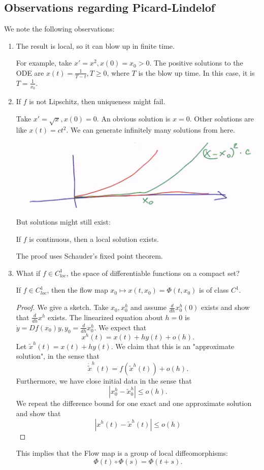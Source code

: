 \documentclass[12pt]{scrartcl}
\begin{document}
\subsection{Observations regarding Picard-Lindelof}
We note the following observations:
\begin{enumerate}
\item The result is local, so it can blow up in finite time.  

For example, take $x' = x^2, x(0) = x_0 > 0$.  The positive solutions to the ODE are $x(t) = \frac{1}{T - t}, T \ge 0$, where $T$ is the blow up time.  In this case, it is $T = \frac{1}{x_0}.$
\item If $f$ is not Lipschitz, then uniqueness might fail.

Take $x' = \sqrt{x}, x(0) = 0$.  An obvious solution is $x = 0$.  Other solutions are like $x(t) = ct^2$.  We can generate infinitely many solutions from here.
\begin{center}
\includegraphics[scale=0.5]{notunique.png}
\end{center}
But solutions might still exist:
\begin{thm}[Peano] If $f$ is continuous, then a local solution exists.
\end{thm}
The proof uses Schauder's fixed point theorem.

\item What if $f \in C_{loc}^1$, the space of differentiable functions on a compact set?
\begin{thm} If $f \in C_{loc}^1$, then the flow map $x_0 \mapsto x(t, x_0) = \Phi(t, x_0)$ is of class $C^1$. 
\end{thm}
\begin{proof}
We give a sketch.  Take $x_0, x_0^h$ and assume $\frac{d}{dh}x_0^h(0)$ exists and show that $\frac{d}{dh}x^h$ exists.  The linearized equation about $h = 0$ is $\dot{y} = Df(x_0)y, y_0 = \frac{d}{dh}x_0^h$.  We expect that $$x^h(t) = x(t) + hy(t) + o(h).$$
Let $\tilde{x}^h(t) = x(t) + hy(t)$.  We claim that this is an "approximate solution", in the sense that $$\dot{\tilde{x}}^h(t) = f(\tilde{x}^h(t)) + o(h).$$
Furthermore, we have close initial data in the sense that
$$|x_0^h - \tilde{x}_0^h| \le o(h).$$
We repeat the difference bound for one exact and one approximate solution and show that 
$$|x^h(t) - \tilde{x}^h(t)| \le o(h)$$
\end{proof}
This implies that the Flow map is a group of local diffeomorphisms:
$$\Phi(t) \circ \Phi(s) = \Phi(t+s).$$
\end{enumerate}
\end{document}
